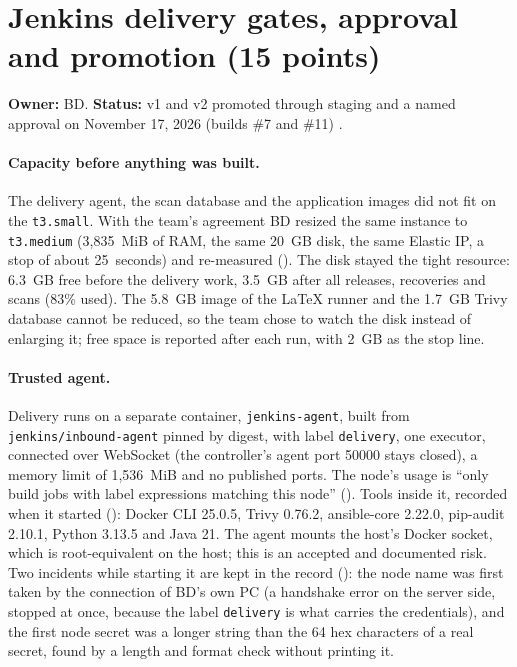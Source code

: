 
\section{Jenkins delivery gates, approval and promotion (15 points)}\label{Section:deliveryJenkins}
\textbf{Owner:} BD. \textbf{Status:} v1 and v2 promoted through staging and a named approval on November 17, 2026 (builds \#7 and \#11) \StatusPass.

\paragraph{Capacity before anything was built.} The delivery agent, the scan database and the application images did not fit on the
\texttt{t3.small}. With the team's agreement BD resized the same instance to \texttt{t3.medium} (3,835~MiB of RAM, the same 20~GB disk,
the same Elastic IP, a stop of about 25~seconds) and re-measured (). The disk stayed the tight resource: 6.3~GB free before the
delivery work, 3.5~GB after all releases, recoveries and scans (83\% used). The 5.8~GB image of the LaTeX runner and the 1.7~GB Trivy database cannot
be reduced, so the team chose to watch the disk instead of enlarging it; free space is reported after each run, with 2~GB as the stop line.

\paragraph{Trusted agent.} Delivery runs on a separate container, \texttt{jenkins-agent}, built from \texttt{jenkins/inbound-agent} pinned by
digest, with label \texttt{delivery}, one executor, connected over WebSocket (the controller's agent port 50000 stays closed), a memory limit
of 1,536~MiB and no published ports. The node's usage is ``only build jobs with label expressions matching this node'' ().
Tools inside it, recorded when it started (): Docker CLI 25.0.5, Trivy 0.76.2, ansible-core 2.22.0, pip-audit 2.10.1, Python 3.13.5 and Java 21.
The agent mounts the host's Docker socket, which is root-equivalent on the host; this is an accepted and documented risk. Two incidents while starting
it are kept in the record (): the node name was first taken by the connection of BD's own PC (a handshake error on the server side, stopped at once, because the label \texttt{delivery}
is what carries the credentials), and the first node secret was a longer string than the 64 hex characters of a real secret, found by a length and format check without printing it.

